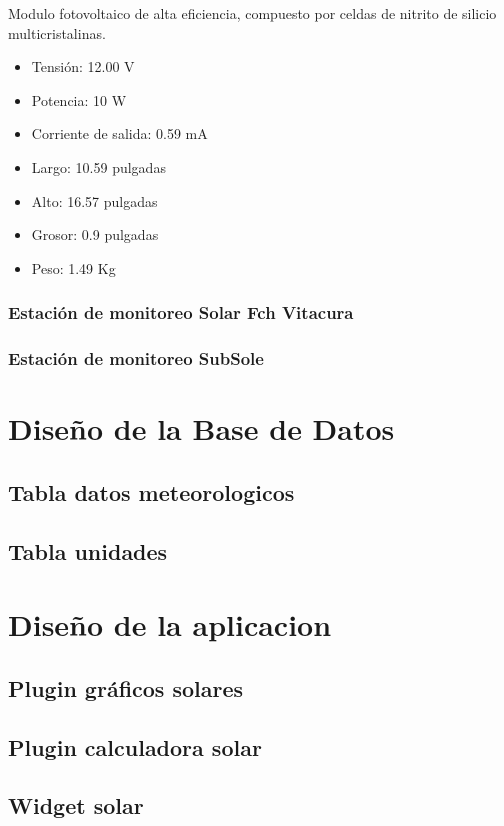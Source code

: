 Modulo fotovoltaico de alta eficiencia, compuesto por celdas de nitrito de silicio multicristalinas.
\begin{itemize}
\item Tensión: 12.00 V
\item Potencia: 10 W
\item Corriente de salida: 0.59 mA
\item Largo: 10.59 pulgadas
\item Alto: 16.57 pulgadas
\item Grosor: 0.9 pulgadas
\item Peso: 1.49 Kg 
\end{itemize}

\subsubsection{Estación de monitoreo Solar Fch Vitacura}
\subsubsection{Estación de monitoreo SubSole}

\section{Diseño de la Base de Datos}
\subsection{Tabla datos meteorologicos}
\subsection{Tabla unidades}

\section{Diseño de la aplicacion}
\subsection{Plugin gráficos solares}
\subsection{Plugin calculadora solar}
\subsection{Widget solar}


